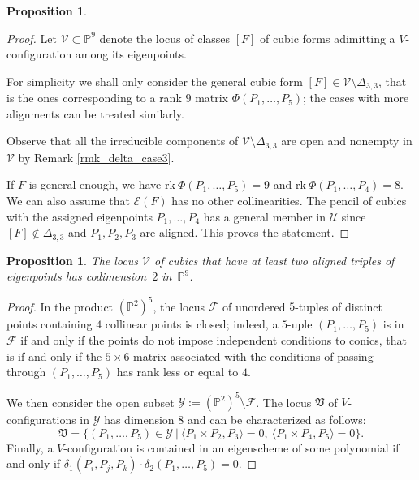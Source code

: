 \documentclass{amsart}
\theoremstyle{plain}
\newtheorem{prop}[lemma]{Proposition}
\theoremstyle{definition}
\newcommand{\p}{\mathbb{P}}
\newcommand{\sU}{\mathcal{U}}
\newcommand{\sV}{\mathcal{V}}
\newcommand{\sF}{\mathcal{F}}
\newcommand{\sY}{\mathcal{Y}}
\newcommand{\Eig}[1]{\mathcal{E}\!\left( {#1} \right)}
\newcommand{\rk}{\ensuremath{\mathrm{rk}}}
\begin{document}
{\begin{prop}
\end{prop}

\begin{proof}
Let $\sV \subset \p^9$ denote the locus of classes $[F]$ of cubic forms adimitting a $V$-configuration among its eigenpoints.

 For simplicity we shall only consider the general cubic form
 $[F] \in \sV \setminus \Delta_{3,3}$, that is the ones corresponding to a rank $9$ matrix $\Phi(P_1, \dots, P_5)$; the cases with more alignments can be treated similarly.

 Observe that all the irreducible components of $\sV \setminus \Delta_{3,3}$ are open and nonempty in $\sV$ by
 Remark \ref{rmk_delta_case3}.

If $F$ is general enough, we have
$\rk \ \Phi(P_1, \dots, P_5)=9$ and $\rk \ \Phi(P_1, \dots, P_4)=8$.
We can also assume that $\Eig{F}$ has no other collinearities.
The pencil of cubics with the assigned eigenpoints $P_1, \dots, P_4$
has a general member in $\sU$ since $[F] \not\in \Delta_{3,3}$ and $P_1,P_2,P_3$ are aligned. This proves the statement.
\end{proof}

\begin{prop}
    The locus $\sV$ of cubics that have at least two aligned triples of eigenpoints has codimension~$2$ in~$\p^9$.
\end{prop}
\begin{proof}
In the product $(\p^2)^{5}$, the locus $\sF$ of
unordered $5$-tuples of distinct points containing $4$ collinear points is closed; indeed, a $5$-uple $(P_1,\dots,P_5)$ is in $\sF$ if and only if the points do not impose independent conditions to conics, that is if and only if the $5 \times 6$ matrix
associated with the
conditions of passing through $(P_1,\dots,P_5)$ has rank less or equal to $4$.

We then consider the open subset $\mathcal {Y}:=(\p^2)^{5} \setminus \sF$.
The locus $\mathfrak{V}$ of $V$-configurations in $\sY$ has dimension $8$ and can be characterized as follows:
$$
\mathfrak{V}= \{(P_1,\dots,P_5) \in \sY \ | \ \langle P_1 \times P_2, P_3\rangle=0, \ \langle P_1 \times P_4, P_5\rangle=0\}.
$$
Finally, a $V$-configuration is contained in an eigenscheme of some polynomial if and only if $\delta_1 (P_i,P_j,P_k) \cdot \delta_2 (P_1,\dots, P_5)=0$.


\end{proof}}
\end{document}
